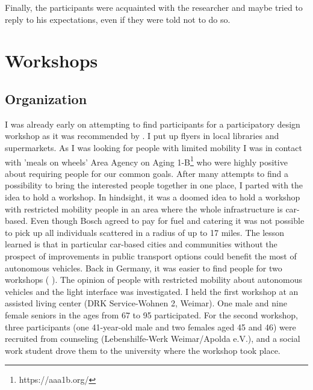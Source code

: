 Finally, the participants were acquainted with the researcher and maybe tried to reply to his expectations, even if they were told not to do so. 

\section{Workshops}


\subsection{Organization}
I was already early on attempting to find participants for a participatory design workshop as it was recommended by \cite{Pettersson}. I put up flyers in local libraries and supermarkets. As I was looking for people with limited mobility I was in contact with 'meals on wheels' Area Agency on Aging 1-B\footnote{https://aaa1b.org/} who were highly positive about requiring people for our common goals. After many attempts to find a possibility to bring the interested people together in one place, I parted with the idea to hold a workshop. In hindsight, it was a doomed idea to hold a workshop with restricted mobility people in an area where the whole infrastructure is car-based. Even though Bosch agreed to pay for fuel and catering it was not possible to pick up all individuals scattered in a radius of up to 17 miles. The lesson learned is that in particular car-based cities and communities without the prospect of improvements in public transport options could benefit the most of autonomous vehicles. 
Back in Germany, it was easier to find people for two workshops ( ). The opinion of people with restricted mobility about autonomous vehicles and the light interface was investigated. I held the first workshop at an assisted living center (DRK Service-Wohnen 2, Weimar). One male and nine female seniors in the ages from 67 to 95 participated. For the second workshop, three participants (one 41-year-old male and two females aged 45 and 46) were recruited from counseling (Lebenshilfe-Werk Weimar/Apolda e.V.), and a social work student drove them to the university where the workshop took place. 
